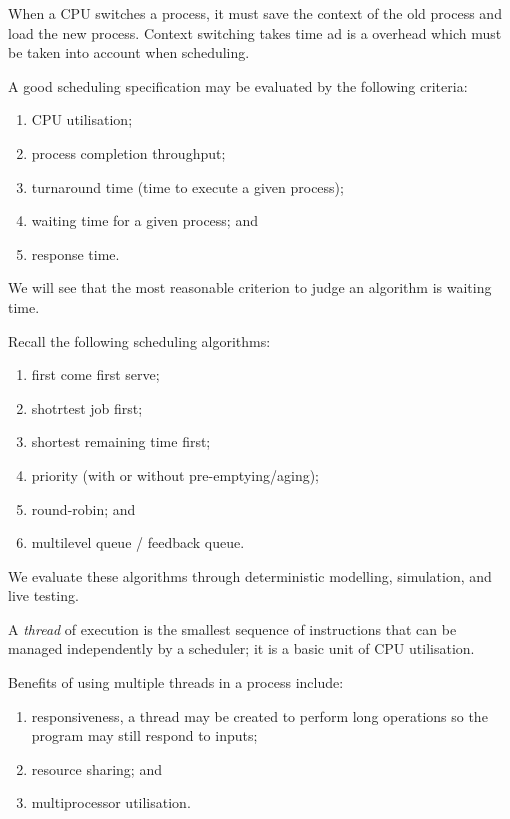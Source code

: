 When a CPU switches a process, it must save the context of the old 
process and load the new process.
Context switching takes time ad is a overhead which must be taken
into account when scheduling.

A good scheduling specification may be evaluated by the following
criteria:
\begin{enumerate}
	\item CPU utilisation;
	\item process completion throughput;
	\item turnaround time (time to execute a given process);
	\item waiting time for a given process; and
	\item response time.
\end{enumerate}

We will see that the most reasonable criterion to judge an algorithm is
waiting time.

Recall the following scheduling algorithms:
\begin{enumerate}
	\item first come first serve;
	\item shotrtest job first;
	\item shortest remaining time first;
	\item priority (with or without pre-emptying/aging);
	\item round-robin; and
	\item multilevel queue / feedback queue.
\end{enumerate}

We evaluate these algorithms through deterministic modelling, simulation, and
live testing.

\begin{definition}[Thread]
	A \emph{thread} of execution is the smallest sequence of instructions that 
	can be managed independently by a scheduler; it is a basic unit of CPU
	utilisation.
\end{definition}

Benefits of using multiple threads in a process include:
\begin{enumerate}
	\item responsiveness, a thread may be created to perform long operations
	so the program may still respond to inputs;
	\item resource sharing; and
	\item multiprocessor utilisation.
\end{enumerate}

